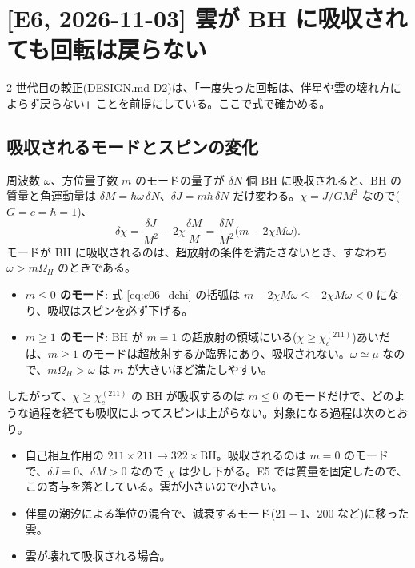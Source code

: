 \section{[E6, 2026-11-03] 雲が BH に吸収されても回転は戻らない}\label{sec:e06}

2 世代目の較正(DESIGN.md D2)は、「一度失った回転は、伴星や雲の壊れ方によらず戻らない」ことを前提にしている。ここで式で確かめる。

\subsection{吸収されるモードとスピンの変化}

周波数 $\omega$、方位量子数 $m$ のモードの量子が $\delta N$ 個 BH に吸収されると、BH の質量と角運動量は $\delta M=\hbar\omega\,\delta N$、$\delta J=m\hbar\,\delta N$ だけ変わる。$\chi=J/GM^2$ なので($G=c=\hbar=1$)、
\begin{equation}
\delta\chi=\frac{\delta J}{M^2}-2\chi\frac{\delta M}{M}=\frac{\delta N}{M^2}\bigl(m-2\chi M\omega\bigr).
\label{eq:e06_dchi}
\end{equation}
モードが BH に吸収されるのは、超放射の条件を満たさないとき、すなわち $\omega>m\Omega_H$ のときである。
\begin{itemize}
\item \textbf{$m\le0$ のモード}: 式 \eqref{eq:e06_dchi} の括弧は $m-2\chi M\omega\le-2\chi M\omega<0$ になり、吸収はスピンを必ず下げる。
\item \textbf{$m\ge1$ のモード}: BH が $m=1$ の超放射の領域にいる($\chi\ge\chi_c^{(211)}$)あいだは、$m\ge1$ のモードは超放射するか臨界にあり、吸収されない。$\omega\simeq\mu$ なので、$m\Omega_H>\omega$ は $m$ が大きいほど満たしやすい。
\end{itemize}
したがって、$\chi\ge\chi_c^{(211)}$ の BH が吸収するのは $m\le0$ のモードだけで、どのような過程を経ても吸収によってスピンは上がらない。対象になる過程は次のとおり。
\begin{itemize}
\item 自己相互作用の $211\times211\to322\times\mathrm{BH}$。吸収されるのは $m=0$ のモードで、$\delta J=0$、$\delta M>0$ なので $\chi$ は少し下がる。E5 では質量を固定したので、この寄与を落としている。雲が小さいので小さい。
\item 伴星の潮汐による準位の混合で、減衰するモード($21{-}1$、$200$ など)に移った雲。
\item 雲が壊れて吸収される場合。
\end{itemize}

